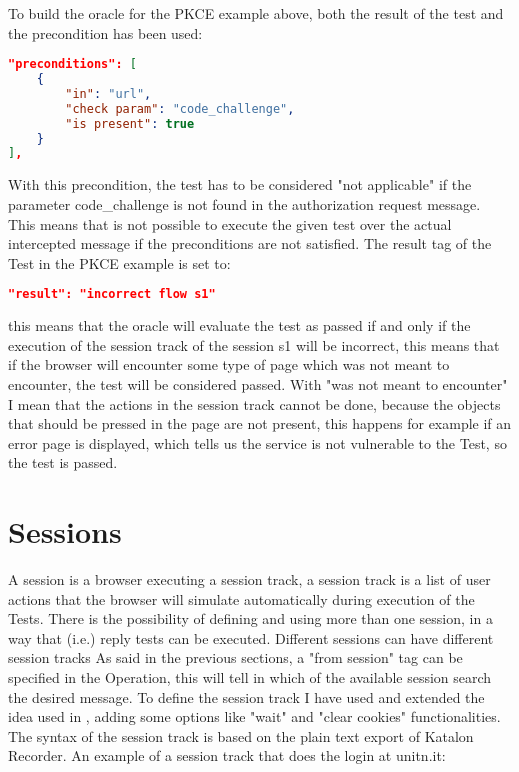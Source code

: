 To build the oracle for the PKCE example above, both the result of the test and the precondition has been used:
\begin{lstlisting}[language=json, caption=Precondition definition]
"preconditions": [
    {
        "in": "url",
        "check param": "code_challenge",
        "is present": true
    }
],
\end{lstlisting}
With this precondition, the test has to be considered "not applicable" if the parameter code\_challenge is not found in the authorization request message. This means that is not possible to execute the given test over the actual intercepted message if the preconditions are not satisfied.
The result tag of the Test in the PKCE example is set to:
\begin{lstlisting}[language=json]
"result": "incorrect flow s1"
\end{lstlisting}
this means that the oracle will evaluate the test as passed if and only if the execution of the \gls{session track} of the session s1 will be incorrect, this means that if the browser will encounter some type of page which was not meant to encounter, the test will be considered passed. With "was not meant to encounter" I mean that the actions in the \gls{session track} cannot be done, because the objects that should be pressed in the page are not present, this happens for example if an error page is displayed, which tells us the service is not vulnerable to the Test, so the test is passed.

\section{Sessions}
A session is a browser executing a \gls{session track}, a \gls{session track} is a list of user actions that the browser will simulate automatically during execution of the Tests. There is the possibility of defining and using more than one session, in a way that (i.e.) reply tests can be executed. Different sessions can have different session tracks
As said in the previous sections, a "from session" tag can be specified in the Operation, this will tell in which of the available session search the desired message. To define the \gls{session track} I have used and extended the idea used in \cite{giulio_pellizzari}\cite{claudio_grisenti}\cite{stefano_facchini}, adding some options like "wait" and "clear cookies" functionalities.
The syntax of the \gls{session track} is based on the plain text export of Katalon Recorder\cite{katalon_recorder_syntax}.
An example of a \gls{session track} that does the login at unitn.it:

